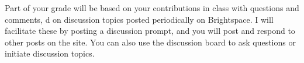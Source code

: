 Part of your grade will be based on your contributions in class with questions and comments, d on discussion topics posted periodically on Brightspace. I will facilitate these by posting a discussion prompt, and you will post and respond to other posts on the site. You can also use the discussion board to ask questions or initiate discussion topics. 
